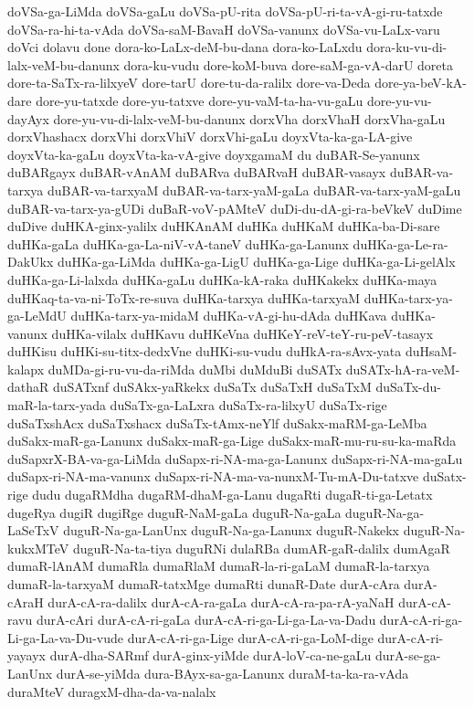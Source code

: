 {doVSa-ga-LiMda
doVSa-gaLu
doVSa-pU-rita
doVSa-pU-ri-ta-vA-gi-ru-tatxde
doVSa-ra-hi-ta-vAda
doVSa-saM-BavaH
doVSa-vanunx
doVSa-vu-LaLx-varu
doVci
dolavu
done
dora-ko-LaLx-deM-bu-dana
dora-ko-LaLxdu
dora-ku-vu-di-lalx-veM-bu-danunx
dora-ku-vudu
dore-koM-buva
dore-saM-ga-vA-darU
doreta
dore-ta-SaTx-ra-lilxyeV
dore-tarU
dore-tu-da-ralilx
dore-va-Deda
dore-ya-beV-kA-dare
dore-yu-tatxde
dore-yu-tatxve
dore-yu-vaM-ta-ha-vu-gaLu
dore-yu-vu-dayAyx
dore-yu-vu-di-lalx-veM-bu-danunx
dorxVha
dorxVhaH
dorxVha-gaLu
dorxVhashacx
dorxVhi
dorxVhiV
dorxVhi-gaLu
doyxVta-ka-ga-LA-give
doyxVta-ka-gaLu
doyxVta-ka-vA-give
doyxgamaM
du
duBAR-Se-yanunx
duBARgayx
duBAR-vAnAM
duBARva
duBARvaH
duBAR-vasayx
duBAR-va-tarxya
duBAR-va-tarxyaM
duBAR-va-tarx-yaM-gaLa
duBAR-va-tarx-yaM-gaLu
duBAR-va-tarx-ya-gUDi
duBaR-voV-pAMteV
duDi-du-dA-gi-ra-beVkeV
duDime
duDive
duHKA-ginx-yalilx
duHKAnAM
duHKa
duHKaM
duHKa-ba-Di-sare
duHKa-gaLa
duHKa-ga-La-niV-vA-taneV
duHKa-ga-Lanunx
duHKa-ga-Le-ra-DakUkx
duHKa-ga-LiMda
duHKa-ga-LigU
duHKa-ga-Lige
duHKa-ga-Li-gelAlx
duHKa-ga-Li-lalxda
duHKa-gaLu
duHKa-kA-raka
duHKakekx
duHKa-maya
duHKaq-ta-va-ni-ToTx-re-suva
duHKa-tarxya
duHKa-tarxyaM
duHKa-tarx-ya-ga-LeMdU
duHKa-tarx-ya-midaM
duHKa-vA-gi-hu-dAda
duHKava
duHKa-vanunx
duHKa-vilalx
duHKavu
duHKeVna
duHKeY-reV-teY-ru-peV-tasayx
duHKisu
duHKi-su-titx-dedxVne
duHKi-su-vudu
duHkA-ra-sAvx-yata
duHsaM-kalapx
duMDa-gi-ru-vu-da-riMda
duMbi
duMduBi
duSATx
duSATx-hA-ra-veM-dathaR
duSATxnf
duSAkx-yaRkekx
duSaTx
duSaTxH
duSaTxM
duSaTx-du-maR-la-tarx-yada
duSaTx-ga-LaLxra
duSaTx-ra-lilxyU
duSaTx-rige
duSaTxshAcx
duSaTxshacx
duSaTx-tAmx-neYlf
duSakx-maRM-ga-LeMba
duSakx-maR-ga-Lanunx
duSakx-maR-ga-Lige
duSakx-maR-mu-ru-su-ka-maRda
duSapxrX-BA-va-ga-LiMda
duSapx-ri-NA-ma-ga-Lanunx
duSapx-ri-NA-ma-gaLu
duSapx-ri-NA-ma-vanunx
duSapx-ri-NA-ma-va-nunxM-Tu-mA-Du-tatxve
duSatx-rige
dudu
dugaRMdha
dugaRM-dhaM-ga-Lanu
dugaRti
dugaR-ti-ga-Letatx
dugeRya
dugiR
dugiRge
duguR-NaM-gaLa
duguR-Na-gaLa
duguR-Na-ga-LaSeTxV
duguR-Na-ga-LanUnx
duguR-Na-ga-Lanunx
duguR-Nakekx
duguR-Na-kukxMTeV
duguR-Na-ta-tiya
duguRNi
dulaRBa
dumAR-gaR-dalilx
dumAgaR
dumaR-lAnAM
dumaRla
dumaRlaM
dumaR-la-ri-gaLaM
dumaR-la-tarxya
dumaR-la-tarxyaM
dumaR-tatxMge
dumaRti
dunaR-Date
durA-cAra
durA-cAraH
durA-cA-ra-dalilx
durA-cA-ra-gaLa
durA-cA-ra-pa-rA-yaNaH
durA-cA-ravu
durA-cAri
durA-cA-ri-gaLa
durA-cA-ri-ga-Li-ga-La-va-Dadu
durA-cA-ri-ga-Li-ga-La-va-Du-vude
durA-cA-ri-ga-Lige
durA-cA-ri-ga-LoM-dige
durA-cA-ri-yayayx
durA-dha-SARmf
durA-ginx-yiMde
durA-loV-ca-ne-gaLu
durA-se-ga-LanUnx
durA-se-yiMda
dura-BAyx-sa-ga-Lanunx
duraM-ta-ka-ra-vAda
duraMteV
duragxM-dha-da-va-nalalx
}
